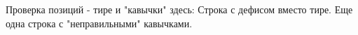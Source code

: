 \documentclass{article}
\begin{document}
Проверка позиций - тире и "кавычки" здесь:
Строка с дефисом вместо тире.
Еще одна строка с "неправильными" кавычками.
\end{document}
